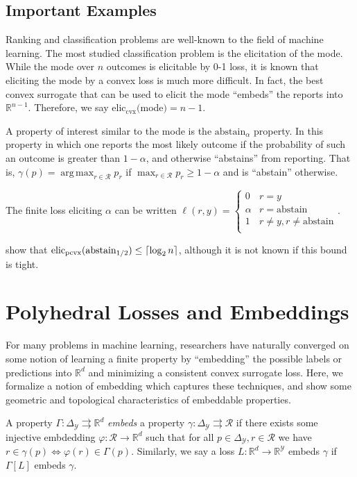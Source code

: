 \documentclass[anon,12pt]{colt2019}
\newcommand{\reals}{\mathbb{R}}
\newcommand{\prop}[1]{\Gamma[#1]}
\newcommand{\eliccvx}{\mathrm{elic}_\mathrm{cvx}}
\newcommand{\elicpoly}{\mathrm{elic}_\mathrm{pcvx}}
\newcommand{\abstain}[1]{\mathrm{abstain}_{#1}}
\newcommand{\simplex}{\Delta_\Y}
\newcommand{\R}{\mathcal{R}}
\newcommand{\Y}{\mathcal{Y}}
\newcommand{\toto}{\rightrightarrows}
\DeclarePairedDelimiter\ceil{\lceil}{\rceil}
\DeclareMathOperator*{\argmax}{arg\,max}
\begin{document}
\subsection{Important Examples}\label{sec:important-examples}
  Ranking and classification problems are well-known to the field of machine learning.
  The most studied classification problem is the elicitation of the mode.
  While the mode over $n$ outcomes is elicitable by 0-1 loss, it is known that eliciting the mode by a convex loss is much more difficult.
  In fact, the best convex surrogate that can be used to elicit the mode ``embeds'' the reports into $\reals^{n-1}$.
  Therefore, we say $\eliccvx($mode$) = n-1$.

  A property of interest similar to the mode is the $\abstain{\alpha}$ property.
  In this property in which one reports the most likely outcome if the probability of such an outcome is greater than $1-\alpha$, and otherwise ``abstains'' from reporting.
  That is, $\gamma(p) = \argmax_{r \in \R}p_r$ if $\max_{r \in \R} p_r \geq 1-\alpha$ and is ``abstain'' otherwise.

  The finite loss eliciting $\alpha$ can be written
  $\ell(r,y) = \begin{cases}
  0 & r = y\\
  \alpha & r = \text{abstain}\\
  1 & r \neq y, r \neq \text{abstain}\\
  \end{cases}$.

\cite{ramaswamy2018consistent} show that $\elicpoly(\abstain{1/2}) \leq \ceil{\log_2 n}$, although it is not known if this bound is tight.


\section{Polyhedral Losses and Embeddings}
\label{sec:poly-loss-embed}

For many problems in machine learning, researchers have naturally converged on some notion of learning a finite property by ``embedding'' the possible labels or predictions into $\reals^d$ and minimizing a consistent convex surrogate loss.
Here, we formalize a notion of embedding which captures these techniques, and show some geometric and topological characteristics of embeddable properties.

\begin{definition}
  A property $\Gamma : \simplex \toto \reals^d$ \emph{embeds} a property $\gamma : \simplex \toto \R$ if there exists some injective embdedding $\varphi:\R\to\reals^d$ such that for all $p\in\simplex,r\in\R$ we have $r \in \gamma(p) \iff \varphi(r) \in \Gamma(p)$.
  Similarly, we say a loss $L:\reals^d\to\reals^\Y$ embeds $\gamma$ if $\prop{L}$ embeds $\gamma$.
\end{definition}
\end{document}
